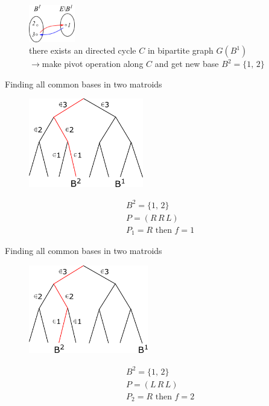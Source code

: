 \documentclass[11pt,xcolor=dvipsnames,table,dvipdfmx]{beamer}
\begin{document}
\begin{frame}
 \begin{figure}
  \centering
  \includegraphics[width=2cm]{path16961.png}\\
  there exists an directed cycle $C$ in bipartite graph $G(B^1)$\\
  $\rightarrow$make pivot operation along $C$ and get new base $B^2 = \{1,\,2\}$ 
 \end{figure}
\end{frame}

\begin{frame}{Finding all common bases in two matroids}
 \begin{figure}
  \centering
  \hspace{0.03cm}
  \includegraphics[width=5cm]{text4989-4.png}
 \end{figure}
 \begin{align*}
  &B^2 = \{1,\,2\}\\
  &P = (R\,R\,L)\\
  &P_1 = R \text{ then } f = 1
 \end{align*}
\end{frame}

\begin{frame}{Finding all common bases in two matroids}
 \begin{figure}
  \centering
  \hspace{0.2cm}
  \includegraphics[width=5.2cm]{text4989-5.png}
 \end{figure}
 \begin{align*}
  &B^2 = \{1,\,2\}\\
  &P = (L\,R\,L)\\
  &P_2 = R \text{ then } f = 2
 \end{align*}
\end{frame}
\end{document}
